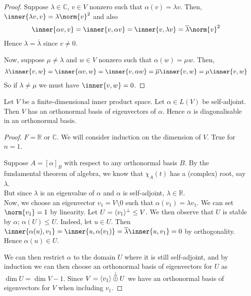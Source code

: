 \begin{proof}
	Suppose $\lambda \in \mathbb C$, $v \in V$ nonzero such that $\alpha(v) = \lambda v$.
	Then, $\inner{\lambda v, v} = \lambda \norm{v}^2$ and also
	\begin{align*}
		\inner{\alpha v, v} = \inner{v, \alpha v} = \inner{v, \lambda v} = \overline{\lambda} \norm{v}^2
	\end{align*}
	Hence $\lambda = \overline{\lambda}$ since $v \neq 0$.

	Now, suppose $\mu \neq \lambda$ and $w \in V$ nonzero such that $\alpha(w) = \mu w$.
	Then,
	\begin{align*}
		\lambda \inner{v, w} = \inner{\alpha v, w} = \inner{v, \alpha w} = \overline{\mu} \inner{v, w} = \mu \inner{v,w}
	\end{align*}
	So if $\lambda \neq \mu$ we must have $\inner{v,w} = 0$.
\end{proof}

\begin{theorem}
	Let $V$ be a finite-dimensional inner product space.
	Let $\alpha \in L(V)$ be self-adjoint.
	Then $V$ has an orthonormal basis of eigenvectors of $\alpha$.
	Hence $\alpha$ is diagonalisable in an orthonormal basis.
\end{theorem}

\begin{proof}
	$F = \mathbb{R}$ or $\mathbb{C}$.
	We will consider induction on the dimension of $V$.
	True for $n = 1$.

	Suppose $A = [\alpha]_B$ with respect to any orthonormal basis $B$.
	By the fundamental theorem of algebra, we know that $\chi_A(t)$ has a (complex) root, say $\lambda$. \\
	But since $\lambda$ is an eigenvalue of $\alpha$ and $\alpha$ is self-adjoint, $\lambda \in \mathbb R$. \\
	Now, we choose an eigenvector $v_1 = V \setminus \qty{0}$ such that $\alpha(v_1) = \lambda v_1$.
	We can set $\norm{v_1} = 1$ by linearity.
	Let $U = \langle{} v_1 \rangle^\perp \leq V$.
	We then observe that $U$ is stable by $\alpha$; $\alpha(U) \leq U$.
	Indeed, let $u \in U$.
	Then $\inner{\alpha(u), v_1} = \inner{u, \alpha(v_1)} = \overline \lambda \inner{u, v_1} = 0$ by orthogonality.
	Hence $\alpha(u) \in U$.

	We can then restrict $\alpha$ to the domain $U$ where it is still self-adjoint, and by induction we can then choose an orthonormal basis of eigenvectors for $U$ as $\dim U = \dim V - 1$.
	Since $V = \langle{} v_1 \rangle \overset{\perp}{\oplus} U$ we have an orthonormal basis of eigenvectors for $V$ when including $v_1$.
\end{proof}

